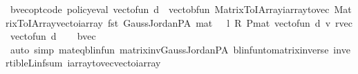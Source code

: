 \begin{isabellebody}
\isamarkupfalse%
%
\endisatagproof
{\isafoldproof}%
%
\isadelimproof
\isanewline
%
\endisadelimproof
\isanewline
{}\isamarkupfalse%
\ {\isasymnu}\isactrlsub b{\isacharunderscore}{\kern0pt}vec{\isacharunderscore}{\kern0pt}opt{\isacharbrackleft}{\kern0pt}code{\isacharbrackright}{\kern0pt}{\isacharcolon}{\kern0pt}\ {\isachardoublequoteopen}policy{\isacharunderscore}{\kern0pt}eval{\isacharprime}{\kern0pt}\ {\isacharparenleft}{\kern0pt}vec{\isacharunderscore}{\kern0pt}to{\isacharunderscore}{\kern0pt}fun\ d{\isacharparenright}{\kern0pt}\ {\isacharequal}{\kern0pt}\ vec{\isacharunderscore}{\kern0pt}to{\isacharunderscore}{\kern0pt}bfun\ {\isacharparenleft}{\kern0pt}Matrix{\isacharunderscore}{\kern0pt}To{\isacharunderscore}{\kern0pt}IArray{\isachardot}{\kern0pt}iarray{\isacharunderscore}{\kern0pt}to{\isacharunderscore}{\kern0pt}vec\ {\isacharparenleft}{\kern0pt}Matrix{\isacharunderscore}{\kern0pt}To{\isacharunderscore}{\kern0pt}IArray{\isachardot}{\kern0pt}vec{\isacharunderscore}{\kern0pt}to{\isacharunderscore}{\kern0pt}iarray\ {\isacharparenleft}{\kern0pt}{\isacharparenleft}{\kern0pt}fst\ {\isacharparenleft}{\kern0pt}Gauss{\isacharunderscore}{\kern0pt}Jordan{\isacharunderscore}{\kern0pt}PA\ {\isacharparenleft}{\kern0pt}{\isacharparenleft}{\kern0pt}mat\ {}\ {\isacharminus}{\kern0pt}\ l\ {\isacharasterisk}{\kern0pt}\isactrlsub R\ {\isacharparenleft}{\kern0pt}P{\isacharunderscore}{\kern0pt}mat\ {\isacharparenleft}{\kern0pt}vec{\isacharunderscore}{\kern0pt}to{\isacharunderscore}{\kern0pt}fun\ d{\isacharparenright}{\kern0pt}{\isacharparenright}{\kern0pt}{\isacharparenright}{\kern0pt}{\isacharparenright}{\kern0pt}{\isacharparenright}{\kern0pt}{\isacharparenright}{\kern0pt}\ {\isacharasterisk}{\kern0pt}v\ {\isacharparenleft}{\kern0pt}r{\isacharunderscore}{\kern0pt}vec{\isacharprime}{\kern0pt}\ {\isacharparenleft}{\kern0pt}vec{\isacharunderscore}{\kern0pt}to{\isacharunderscore}{\kern0pt}fun\ d{\isacharparenright}{\kern0pt}{\isacharparenright}{\kern0pt}{\isacharparenright}{\kern0pt}{\isacharparenright}{\kern0pt}{\isacharparenright}{\kern0pt}{\isachardoublequoteclose}\isanewline
%
\isadelimproof
\ \ %
\endisadelimproof
%
\isatagproof
{}\isamarkupfalse%
\ {\isasymnu}\isactrlsub b{\isacharunderscore}{\kern0pt}vec\isanewline
\ \ \isamarkupfalse%
\ {\isacharparenleft}{\kern0pt}auto\ simp{\isacharcolon}{\kern0pt}\ mat{\isacharunderscore}{\kern0pt}eq{\isacharunderscore}{\kern0pt}blinfun\ matrix{\isacharunderscore}{\kern0pt}inv{\isacharunderscore}{\kern0pt}Gauss{\isacharunderscore}{\kern0pt}Jordan{\isacharunderscore}{\kern0pt}PA\ blinfun{\isacharunderscore}{\kern0pt}to{\isacharunderscore}{\kern0pt}matrix{\isacharunderscore}{\kern0pt}inverse{\isacharparenleft}{\kern0pt}{}{\isacharparenright}{\kern0pt}\ invertible\isactrlsub L{\isacharunderscore}{\kern0pt}inf{\isacharunderscore}{\kern0pt}sum\ iarray{\isacharunderscore}{\kern0pt}to{\isacharunderscore}{\kern0pt}vec{\isacharunderscore}{\kern0pt}vec{\isacharunderscore}{\kern0pt}to{\isacharunderscore}{\kern0pt}iarray{\isacharparenright}{\kern0pt}%

\end{isabellebody}
